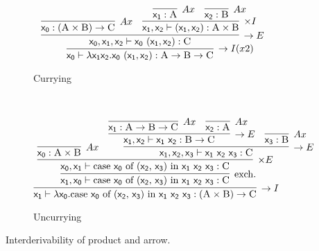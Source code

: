 \begin{figure}
	\centering
	\begin{subfigure}{1\textwidth}
		\[
		\infer[\to I (x2)]{\term{x_0} \vdash \term{\lambda x_1x_2.x_0~(\term{x_1},\term{x_2})}: \prop{A} \to \prop{B} \to \prop{C}}{
			\infer[\to E]{\term{x_0}, \term{x_1}, \term{x_2} \vdash \term{x_0}~(\term{x_1}, \term{x_2}): \prop{C}}{
				\infer[Ax]{\term{x_0}: (\prop{A} \times \prop{B}) \to \prop{C}}{}
				&
				\infer[\times I]{ \term{x_1}, \term{x_2} \vdash (\term{x_1},\term{x_2}): \prop{A} \times \prop{B}}{
					\infer[Ax]{\term{x_1}: \prop{A}}{}
					&			
					\infer[Ax]{\term{x_2}: \prop{B}}{}
				}
			}
		}
		\]
		\caption{Currying}
		\label{subfigure:currying}
	\end{subfigure}\\[\midsep]
	\begin{subfigure}{1\textwidth}
		\[
			\infer[\to I]{\term{x_1} \vdash \term{\lambda x_0.}\cterm{case \term{x_0} of (\term{x_2}, \term{x_3}) in \term{x_1~x_2~x_3}}:(\prop{A} \times \prop{B})\to \prop{C}}{
				\infer[\Exchange{}]{\term{x_1}, \term{x_0}  \vdash \cterm{case \term{x_0} of (\term{x_2}, \term{x_3}) in \term{x_1~x_2~x_3}}:\prop{C}}{
					\infer[\times E]{\term{x_0}, \term{x_1} \vdash \cterm{case \term{x_0} of (\term{x_2}, \term{x_3}) in \term{x_1~x_2~x_3}}:\prop{C}}{
						\infer[Ax]{\term{x_0}: \prop{A} \times \prop{B}}{}
						&
						\infer[\to E]{\term{x_1}, \term{x_2}, \term{x_3} \vdash \term{x_1~x_2~x_3}: \prop{C}}{
							\infer[\to E]{\term{x_1}, \term{x_2} \vdash \term{x_1~x_2}: \prop{B} \to \prop{C}}{
								\infer[Ax]{\term{x_1}: \prop{A} \to \prop{B} \to \prop{C}}{}
								&
								\infer[Ax]{\term{x_2}: \prop{A}}{}
							}
							&
							\infer[Ax]{\term{x_3}: \prop{B}}{}
						}
					}
				}
			}
		\]
		\caption{Uncurrying}
		\label{subfigure:uncurrying}
	\end{subfigure}
	\caption{Interderivability of product and arrow.}
	\label{figure:curry_uncurry}
\end{figure}


